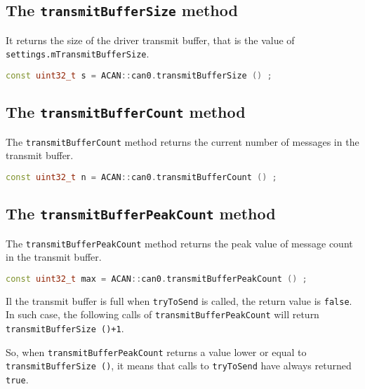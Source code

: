 \documentclass[10pt, a4paper, obeyspaces, openany]{extarticle}
\begin{document}
\subsection{The \texttt{transmitBufferSize} method}

It returns the size of the driver transmit buffer, that is the value of \texttt{settings.mTransmitBufferSize}.
{ \small\begin{lstlisting}[language=c++]
const uint32_t s = ACAN::can0.transmitBufferSize () ;
\end{lstlisting}}


\subsection{The \texttt{transmitBufferCount} method}

The \texttt{transmitBufferCount} method returns the current number of messages in the transmit buffer.
{ \small\begin{lstlisting}[language=c++]
const uint32_t n = ACAN::can0.transmitBufferCount () ;
\end{lstlisting}}


\subsection{The \texttt{transmitBufferPeakCount} method}

The \texttt{transmitBufferPeakCount} method returns the peak value of message count in the transmit buffer.
{ \small\begin{lstlisting}[language=c++]
const uint32_t max = ACAN::can0.transmitBufferPeakCount () ;
\end{lstlisting}}

Il the transmit buffer is full when \texttt{tryToSend} is called, the return value is \texttt{false}. In such case, the following calls of \texttt{transmitBufferPeakCount} will return \texttt{transmitBufferSize ()+1}. 

So, when \texttt{transmitBufferPeakCount} returns a value lower or equal to \texttt{transmitBufferSize ()}, it means that calls to \texttt{tryToSend} have always returned \texttt{true}.
\end{document}

